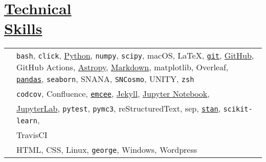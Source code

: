 \documentclass[margin]{res}
\begin{document}
\begin{resume}
\begin{tabular}{l p{4.3in}}
\end{tabular}







\section{\href{https://github.com/benjaminrose}{Technical \\Skills}}

\hspace{1pt}
\begin{tabular}{l p{4.5in}}

\hspace{-1em}{\bf Daily Use:} & 
\texttt{bash},
\texttt{click},
\href{https://www.python.org}{Python},
\texttt{numpy},
\texttt{scipy},
macOS,
\LaTeX,
\href{https://git-scm.com}{\texttt{git}},
\href{https://github.com/benjaminrose}{GitHub},
GitHub Actions,
\href{http://www.astropy.org}{Astropy},
\href{http://daringfireball.net/projects/markdown/}{Markdown},
matplotlib,
Overleaf,
\href{http://pandas.pydata.org}{\texttt{pandas}},
\texttt{seaborn},
SNANA,
\texttt{SNCosmo},
UNITY,
\texttt{zsh}
\\

\hspace{-1em}{\bf Proficient:} & 
\texttt{codcov},
Confluence,
\href{http://dan.iel.fm/emcee/current/}{\texttt{emcee}},
\href{https://jekyllrb.com}{Jekyll},
\href{http://jupyter.org}{Jupyter Notebook},
\\&
\href{https://jupyterlab.readthedocs.io/en/stable/}{JupyterLab},
\texttt{pytest},
\texttt{pymc3},
reStructuredText,
sep,
\href{http://mc-stan.org}{\texttt{stan}},
\texttt{scikit-learn},
\\&
TravisCI\vspace{0.3em}
\\

\hspace{-1em}{\bf Competent:} & HTML,
CSS,
Linux,
\texttt{george},
Windows,
Wordpress%
\end{tabular}







\end{resume}
\end{document}

